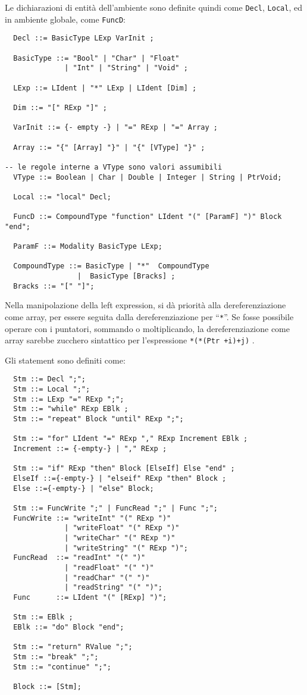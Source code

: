 \documentclass{article}
\begin{document}
Le dichiarazioni di entità dell'ambiente sono definite quindi come \texttt{Decl}, \texttt{Local}, ed in ambiente globale,
come \texttt{FuncD}:
\begin{verbatim}
  Decl ::= BasicType LExp VarInit ;

  BasicType ::= "Bool" | "Char" | "Float" 
              | "Int" | "String" | "Void" ;
  
  LExp ::= LIdent | "*" LExp | LIdent [Dim] ;

  Dim ::= "[" RExp "]" ;

  VarInit ::= {- empty -} | "=" RExp | "=" Array ;

  Array ::= "{" [Array] "}" | "{" [VType] "}" ;

-- le regole interne a VType sono valori assumibili
  VType ::= Boolean | Char | Double | Integer | String | PtrVoid;
  
  Local ::= "local" Decl;
  
  FuncD ::= CompoundType "function" LIdent "(" [ParamF] ")" Block "end";

  ParamF ::= Modality BasicType LExp;

  CompoundType ::= BasicType | "*"  CompoundType 
                 |  BasicType [Bracks] ;
  Bracks ::= "[" "]";
\end{verbatim}
Nella manipolazione della left expression, si dà priorità alla dereferenziazione come array, per essere
seguita dalla dereferenziazione per ``\texttt{*}''. Se fosse possibile operare con i puntatori, sommando
o moltiplicando, la dereferenziazione come array sarebbe zucchero sintattico per l'espressione \texttt{*(*(Ptr +i)+j)} .

Gli statement sono definiti come:
\begin{verbatim}
  Stm ::= Decl ";";
  Stm ::= Local ";";
  Stm ::= LExp "=" RExp ";";
  Stm ::= "while" RExp EBlk ;
  Stm ::= "repeat" Block "until" RExp ";";
  
  Stm ::= "for" LIdent "=" RExp "," RExp Increment EBlk ;
  Increment ::= {-empty-} | "," RExp ;
  
  Stm ::= "if" RExp "then" Block [ElseIf] Else "end" ;
  ElseIf ::={-empty-} | "elseif" RExp "then" Block ;
  Else ::={-empty-} | "else" Block;
  
  Stm ::= FuncWrite ";" | FuncRead ";" | Func ";";
  FuncWrite ::= "writeInt" "(" RExp ")"
              | "writeFloat" "(" RExp ")"
              | "writeChar" "(" RExp ")"
              | "writeString" "(" RExp ")";
  FuncRead  ::= "readInt" "(" ")"
              | "readFloat" "(" ")"
              | "readChar" "(" ")"
              | "readString" "(" ")";
  Func      ::= LIdent "(" [RExp] ")";
  
  Stm ::= EBlk ;
  EBlk ::= "do" Block "end";
  
  Stm ::= "return" RValue ";";
  Stm ::= "break" ";";
  Stm ::= "continue" ";";
  
  Block ::= [Stm];
  
  
\end{verbatim}
\end{document}
